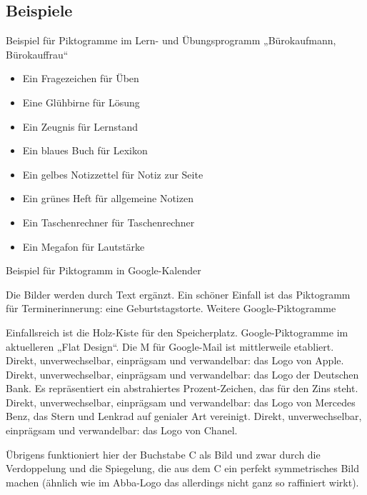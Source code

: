 \subsection{Beispiele}
Beispiel für Piktogramme im Lern- und Übungsprogramm  „Bürokaufmann, Bürokauffrau“  
\begin{itemize}
\item Ein Fragezeichen für Üben
\item Eine Glühbirne für Lösung
\item Ein Zeugnis für Lernstand
\item Ein blaues Buch für Lexikon
\item Ein gelbes Notizzettel für Notiz zur Seite
\item Ein grünes Heft für allgemeine Notizen
\item Ein Taschenrechner für Taschenrechner
\item Ein Megafon für Lautstärke
\end{itemize}
Beispiel für Piktogramm in Google-Kalender

Die Bilder werden durch Text ergänzt. Ein schöner Einfall ist das Piktogramm für Terminerinnerung: eine Geburtstagstorte.
Weitere Google-Piktogramme

Einfallsreich ist die Holz-Kiste für den Speicherplatz.
Google-Piktogramme im aktuelleren „Flat Design“. Die M für Google-Mail  ist mittlerweile etabliert.
Direkt, unverwechselbar, einprägsam und verwandelbar: das Logo von Apple.
Direkt, unverwechselbar, einprägsam und verwandelbar: das Logo der Deutschen Bank. Es repräsentiert ein abstrahiertes Prozent-Zeichen, das für den Zins steht. 
Direkt, unverwechselbar, einprägsam und verwandelbar: das Logo von Mercedes Benz, das Stern und Lenkrad auf genialer Art vereinigt. 
Direkt, unverwechselbar, einprägsam und verwandelbar: das Logo von Chanel.

Übrigens funktioniert hier der Buchstabe C als Bild und zwar durch die Verdoppelung und die Spiegelung, die aus dem C ein perfekt symmetrisches Bild machen (ähnlich wie im Abba-Logo das allerdings nicht ganz so raffiniert wirkt).

